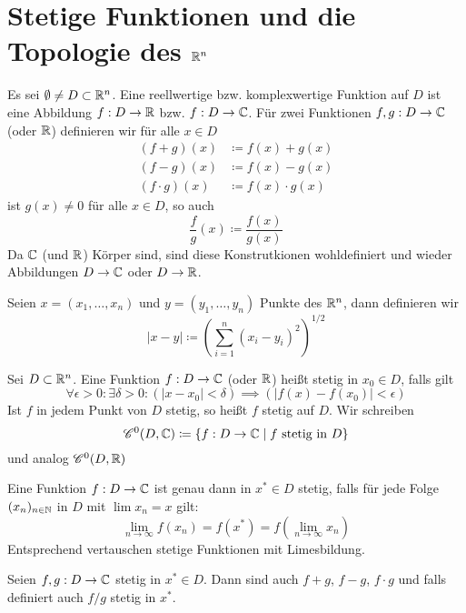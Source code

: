 \section{Stetige Funktionen und die Topologie des $\mathbb{R}^n$}
\begin{defn}
    Es sei $\emptyset\neq D\subset \mathbb{R}^n$. Eine reellwertige bzw. komplexwertige Funktion auf $D$ ist eine Abbildung $f:D\to \mathbb{R}$ bzw. $f:D\to \mathbb{C}$.
    Für zwei Funktionen $f,g:D\to \mathbb{C}$ (oder $\mathbb{R}$) definieren wir für alle $x\in D$
    \begin{align*}
        (f+g)(x) &\coloneqq f(x)+g(x) \\
        (f-g)(x) &\coloneqq f(x)-g(x) \\
        (f\cdot g)(x) &\coloneqq f(x)\cdot g(x) 
    \end{align*}
    ist $g(x)\neq 0$ für alle $x\in D$, so auch 
    \[
    \frac{f}{g}(x) \coloneqq \frac{f(x)}{g(x)}    
    \]
    Da $\mathbb{C}$ (und $\mathbb{R}$) Körper sind, sind diese Konstrutkionen wohldefiniert und wieder Abbildungen $D\to \mathbb{C}$ oder $D\to \mathbb{R}$.
\end{defn}
\begin{defn}
    Seien $x=(x_1,\ldots,x_n)$ und $y=(y_1,\ldots,y_n)$ Punkte des $\mathbb{R}^n$, dann definieren wir 
    \[
    \vert x-y\vert \coloneqq \left(\sum_{i=1}^n (x_i-y_i)^2\right)^{1/2}    
    \]
\end{defn}
\begin{defn}
    Sei $D\subset \mathbb{R}^n$. Eine Funktion $f:D\to \mathbb{C}$ (oder $\mathbb{R}$) heißt stetig in $x_0\in D$, falls gilt
    \[
    \forall \epsilon >0 : \exists \delta >0 : (\vert x-x_0\vert<\delta) \implies (\vert f(x)-f(x_0)\vert < \epsilon)    
    \]
    Ist $f$ in jedem Punkt von $D$ stetig, so heißt $f$ stetig auf $D$. Wir schreiben
    \[
    \mathscr{C}^0(D,\mathbb{C}) \coloneqq \{ f:D\to \mathbb{C} \mid f \text{ stetig in } D\}    
    \]
    und analog $\mathscr{C}^0(D,\mathbb{R})$
\end{defn}
\begin{satz}
    Eine Funktion $f:D\to \mathbb{C}$ ist genau dann in $x^*\in D$ stetig, falls für jede Folge $(x_n)_{n\in \mathbb{N}}$ in $D$ mit $\lim x_n =x$ gilt:
    \[
    \lim_{n\to \infty} f(x_n) = f(x^*) = f(\lim_{n\to\infty} x_n)    
    \]
    Entsprechend \glqq vertauschen stetige Funktionen mit Limesbildung\grqq.
\end{satz}
\begin{satz}[Rechenregeln]
    Seien $f,g:D\to \mathbb{C}$ stetig in $x^*\in D$. Dann sind auch $f+g$, $f-g$, $f\cdot g$ und falls definiert auch $f/g$ stetig in $x^*$.
\end{satz}
